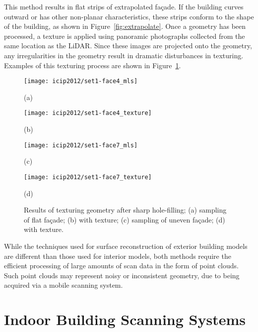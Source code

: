 \documentclass[12pt,onecolumn,oneside]{book}
\begin{document}
This method results in flat strips of extrapolated fa\c{c}ade.  If the building curves outward or has other non-planar characteristics, these strips conform to the shape of the building, as shown in Figure~\ref{fig:extrapolate}.  Once a geometry has been processed, a texture is applied using panoramic photographs collected from the same location as the LiDAR.  Since these images are projected onto the geometry, any irregularities in the geometry result in dramatic disturbances in texturing.  Examples of this texturing process are shown in Figure~\ref{fig:icip2012_texture}.

\begin{figure}[b]

\begin{minipage}[b]{.48\linewidth}
  \centering
  \centerline{\texttt{[image: icip2012/set1-face4\_mls]}}
  \centerline{(a)}\medskip
\end{minipage}
\hfill
\begin{minipage}[b]{.48\linewidth}
  \centering
  \centerline{\texttt{[image: icip2012/set1-face4\_texture]}}
  \centerline{(b)}\medskip
\end{minipage}
%
\begin{minipage}[b]{.48\linewidth}
  \centering
  \centerline{\texttt{[image: icip2012/set1-face7\_mls]}}
  \centerline{(c)}\medskip
\end{minipage}
\hfill
\begin{minipage}[b]{.48\linewidth}
  \centering
  \centerline{\texttt{[image: icip2012/set1-face7\_texture]}}
  \centerline{(d)}\medskip
\end{minipage}
\caption[Meshes of building fa\c{c}ades with texture.]{Results of texturing geometry after sharp hole-filling; (a) sampling of flat fa\c{c}ade; (b) with texture; (c) sampling of uneven fa\c{c}ade; (d) with texture.}
\label{fig:icip2012_texture}
\end{figure}

While the techniques used for surface reconstruction of exterior building models are different than those used for interior models, both methods require the efficient processing of large amounts of scan data in the form of point clouds.  Such point clouds may represent noisy or inconsistent geometry, due to being acquired via a mobile scanning system.

\FloatBarrier
\section{Indoor Building Scanning Systems}
\label{sec:indoor_scanning}
\end{document}
